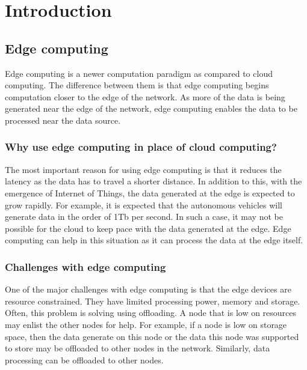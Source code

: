 
\chapter{Introduction}

\graphicspath{{Figs}}

\section{Edge computing}

Edge computing is a newer computation paradigm as compared to cloud computing.
The difference between them is that edge computing begins computation closer to the
edge of the network. As more of the data is being generated near the edge of the
network, edge computing enables the data to be processed near the data source.
\cite{weisongshiEdgeComputingVision2016}

\subsection{Why use edge computing in place of cloud computing?}

The most important reason for using edge computing is that it reduces the
latency as the data has to travel a shorter distance.
\cite{weisongshiEdgeComputingVision2016} In addition to this, with the emergence of
Internet of Things, the data generated at the edge is expected to grow rapidly.
For example, it is expected that the autonomous vehicles will generate data in
the order of 1Tb per second. In such a case, it may not be possible for the
cloud to keep pace with the data generated at the edge. Edge computing can help
in this situation as it can process the data at the edge itself.

\subsection{Challenges with edge computing}

One of the major challenges with edge computing is that the edge devices are
resource constrained. They have limited processing power, memory and storage.
Often, this problem is solving using offloading. A node that is low on resources
may enlist the other nodes for help. For example, if a node is low on storage
space, then the data generate on this node or the data this node was supported
to store may be offloaded to other nodes in the network. Similarly, data
processing can be offloaded to other nodes.

